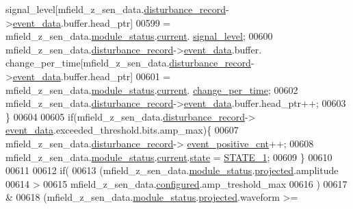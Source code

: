 \begin{DoxyCode}
      signal\_level[mfield\_z\_sen\_data.\hyperlink{a00027_ac9b38e2c1d3f1013a88d33506c754152}{disturbance\_record}->\hyperlink{a00028_a8c0bda69e71ef674e60da47ad0be9ab0}{event\_data}.buffer.head\_ptr]
00599                     = mfield\_z\_sen\_data.\hyperlink{a00027_adfab5a5d8b45a93dfb13edb24e2b80e3}{module\_status}.\hyperlink{a00019_acf41ffc11da291c2f9f0fcb02ee72b98}{current}.
      \hyperlink{a00019_a4070db8eab0ff93e3fbc1df59872f117}{signal\_level};
00600             mfield\_z\_sen\_data.\hyperlink{a00027_ac9b38e2c1d3f1013a88d33506c754152}{disturbance\_record}->\hyperlink{a00028_a8c0bda69e71ef674e60da47ad0be9ab0}{event\_data}.buffer.
      change\_per\_time[mfield\_z\_sen\_data.\hyperlink{a00027_ac9b38e2c1d3f1013a88d33506c754152}{disturbance\_record}->\hyperlink{a00028_a8c0bda69e71ef674e60da47ad0be9ab0}{event\_data}.buffer.head\_ptr]
00601                     = mfield\_z\_sen\_data.\hyperlink{a00027_adfab5a5d8b45a93dfb13edb24e2b80e3}{module\_status}.\hyperlink{a00019_acf41ffc11da291c2f9f0fcb02ee72b98}{current}.
      \hyperlink{a00019_a0f645dd76b41adc6a966feba8e4bff8c}{change\_per\_time};
00602             mfield\_z\_sen\_data.\hyperlink{a00027_ac9b38e2c1d3f1013a88d33506c754152}{disturbance\_record}->\hyperlink{a00028_a8c0bda69e71ef674e60da47ad0be9ab0}{event\_data}.buffer.head\_ptr++;
00603             \}
00604 
00605             \textcolor{keywordflow}{if}(mfield\_z\_sen\_data.\hyperlink{a00027_ac9b38e2c1d3f1013a88d33506c754152}{disturbance\_record}->
      \hyperlink{a00028_a8c0bda69e71ef674e60da47ad0be9ab0}{event\_data}.exceeded\_threshold.bits.amp\_max)\{
00607                mfield\_z\_sen\_data.\hyperlink{a00027_ac9b38e2c1d3f1013a88d33506c754152}{disturbance\_record}->
      \hyperlink{a00028_a7397b9d76d4b57500f27bb23d258a18a}{event\_positive\_cnt}++;
00608                mfield\_z\_sen\_data.\hyperlink{a00027_adfab5a5d8b45a93dfb13edb24e2b80e3}{module\_status}.\hyperlink{a00019_acf41ffc11da291c2f9f0fcb02ee72b98}{current}.\hyperlink{a00019_a6b8d8e916bc56265a3fd279bd26b6d1b}{state} = 
      \hyperlink{a00021_a727351838367f27ac0adb9a13422c342}{STATE\_1};
00609             \}
00610 
00611 
00612               \textcolor{keywordflow}{if}(
00613                  (mfield\_z\_sen\_data.\hyperlink{a00027_adfab5a5d8b45a93dfb13edb24e2b80e3}{module\_status}.\hyperlink{a00019_af2267fb093fb5dcaa006a570a6da3b6b}{projected}.amplitude
00614                  >
00615                   mfield\_z\_sen\_data.\hyperlink{a00027_a94b2d1f6ea4ab334c74d24984dd27843}{configured}.amp\_treshold\_max
00616                  )
00617                  &
00618                  (mfield\_z\_sen\_data.\hyperlink{a00027_adfab5a5d8b45a93dfb13edb24e2b80e3}{module\_status}.\hyperlink{a00019_af2267fb093fb5dcaa006a570a6da3b6b}{projected}.waveform >= 

\end{DoxyCode}
